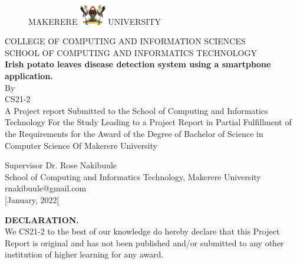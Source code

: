 \documentclass[11pt]{report}
\begin{document}
	

\begin{titlepage}
\begin{figure}[h]
  \centerline{\small MAKERERE 
  \includegraphics[width=0.1\textwidth]  {muk} UNIVERSITY}
\end{figure}
\begin{center}
COLLEGE OF COMPUTING AND INFORMATION SCIENCES\\
SCHOOL OF COMPUTING AND INFORMATICS TECHNOLOGY\\


\textbf{Irish potato leaves disease detection system using a smartphone application.}\\ 
By\\
CS21-2\\

A Project report Submitted to the School of Computing and Informatics Technology
For the Study Leading to a Project Report in Partial Fulfillment of the
Requirements for the Award of the Degree of Bachelor of Science in Computer Science 
Of Makerere University

Supervisor
Dr. Rose Nakibuule\\

School of Computing and Informatics Technology, Makerere University\\
rnakibuule@gmail.com\\

[January, 2022]\\

\end{center}

\end{titlepage}



\newpage
\textbf{DECLARATION.}\\

We CS21-2 to the best of our knowledge do hereby declare that this Project Report is
original and has not been published and/or submitted to any other institution of higher learning for
any award.\\
\end{document}
